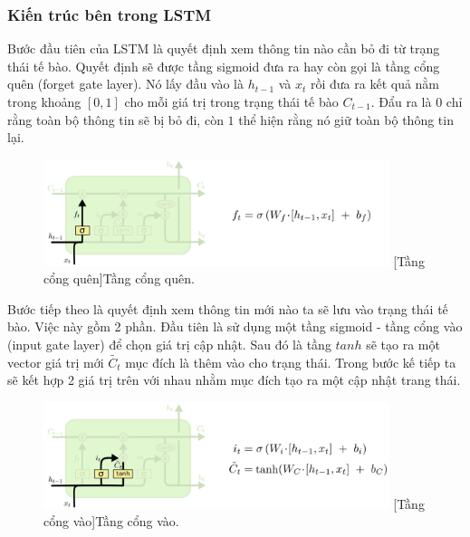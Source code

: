 \subsubsection{Kiến trúc bên trong LSTM}
Bước đầu tiên của LSTM là quyết định xem thông tin nào cần bỏ đi từ trạng thái tế bào. Quyết định sẽ được  tầng sigmoid đưa ra hay còn gọi là tầng cổng quên (forget gate layer). Nó lấy đầu vào là $h_{t-1}$ và $x_t$  rồi đưa ra kết quả nằm trong khoảng $[0, 1]$ cho mỗi giá trị trong trạng thái tế bào $C_{t-1}$. Đẩu ra là $0$ chỉ rằng toàn bộ thông tin sẽ bị bỏ đi, còn $1$ thể hiện rằng nó giữ toàn bộ thông tin lại.\\

\begin{figure}[H]
    \centering
\includegraphics[width=0.9\textwidth]{figures/LSTM3-focus-f.png}
    [Tầng cổng quên]{Tầng cổng quên.}
\end{figure}
\par
Bước tiếp theo là quyết định xem thông tin mới nào ta sẽ lưu vào trạng thái tế bào. Việc này gồm 2 phần. Đầu tiên là sử dụng một tầng sigmoid - tầng cổng vào (input gate layer) để chọn giá trị cập nhật. Sau đó là tầng $tanh$ sẽ tạo ra một vector giá trị mới $\tilde{C_t}$ mục đích là thêm vào cho trạng thái. Trong bước kế tiếp ta sẽ kết hợp 2 giá trị trên với nhau nhằm mục đích tạo ra một cập nhật trang thái. \\
\begin{figure}[H]
    \centering
\includegraphics[width=0.9\textwidth]{figures/LSTM3-focus-i.png}
    [Tầng cổng vào]{Tầng cổng vào.}
\end{figure}

